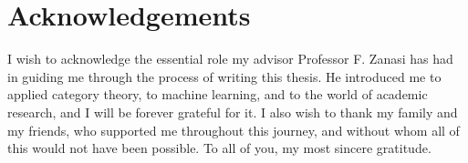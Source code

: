 \documentclass[11pt,a4paper,openright,twoside]{report}
\theoremstyle{plain}
\theoremstyle{definition}
\begin{document}


{}



\clearpage{\pagestyle{empty}\cleardoublepage}





\chapter*{Acknowledgements}

\thispagestyle{empty}

I wish to acknowledge the essential role my advisor Professor F. Zanasi has had in guiding me through the process of writing this thesis. He introduced me to applied category theory, to machine learning, and to the world of academic research, and I will be forever grateful for it. I also wish to thank my family and my friends, who supported me throughout this journey, and without whom all of this would not have been possible. To all of you, my most sincere gratitude.
\end{document}

